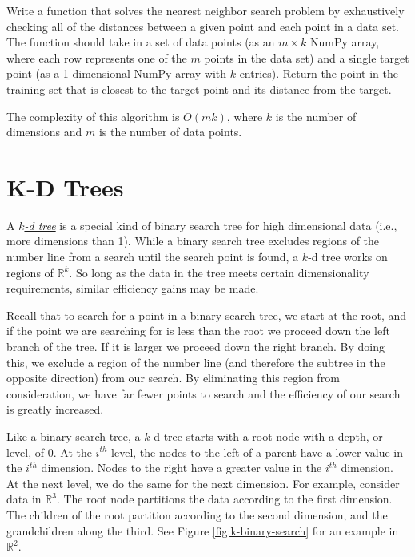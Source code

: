 \begin{problem}
Write a function that solves the nearest neighbor search problem by exhaustively checking all of the distances between a given point and each point in a data set.
The function should take in a set of data points (as an $m \times k$ NumPy array, where each row represents one of the $m$ points in the data set) and a single target point (as a 1-dimensional NumPy array with $k$ entries).
Return the point in the training set that is closest to the target point and its distance from the target.

The complexity of this algorithm is $O(mk)$, where $k$ is the number of dimensions and $m$ is the number of data points.
\end{problem}

\section*{K-D Trees}

A \href{https://en.wikipedia.org/wiki/K-d_tree}{\emph{$k$-d tree}} is a special kind of binary search tree for high dimensional data (i.e., more dimensions than 1).
While a binary search tree excludes regions of the number line from a search until the search point is found, a $k$-d tree works on regions of $\mathbb{R}^k$.
So long as the data in the tree meets certain dimensionality requirements, similar efficiency gains may be made.

Recall that to search for a point in a binary search tree, we start at the root, and if the point we are searching for is less than the root we proceed down the left branch of the tree.
If it is larger we proceed down the right branch.
By doing this, we exclude a region of the number line (and therefore the subtree in the opposite direction) from our search.
By eliminating this region from consideration, we have far fewer points to search and the efficiency of our search is greatly increased.

Like a binary search tree, a $k$-d tree starts with a root node with a depth, or level, of 0.
At the $i^{th}$ level, the nodes to the left of a parent have a lower value in the $i^{th}$ dimension.
Nodes to the right have a greater value in the $i^{th}$ dimension.
At the next level, we do the same for the next dimension.
For example, consider data in $\mathbb{R}^3$.
The root node partitions the data according to the first dimension.
The children of the root partition according to the second dimension, and the grandchildren along the third.
See Figure \ref{fig:k-binary-search} for an example in $\mathbb{R}^2$.

